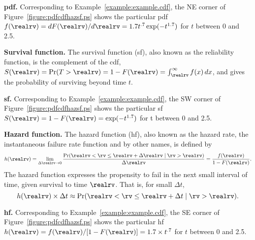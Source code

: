 \begin{example}
\label{example:example.pdf}{\bf pdf.}
Corresponding to Example~\ref{example:example.cdf}, the NE corner of
Figure~\ref{figure:pdfcdfhazsf.ps} shows the particular pdf
$f(\realrv)=dF(\realrv)/d\realrv=1.7t^{.7}\exp(-t^{1.7})$ for $t$
between 0 and 2.5.
\end{example}



\noindent
{\bf Survival function.}
The survival function (sf), also known as the reliability function, is
the complement of the cdf, $S(\realrv)=\Pr(T >
\realrv)=1-F(\realrv)=\int^{\infty}_{\realrv} f(x)\, dx$, and gives the
probability of surviving beyond time $t$.

\begin{example}
\label{example:example.sf}{\bf sf.}
Corresponding to Example~\ref{example:example.cdf}, the SW corner of
Figure~\ref{figure:pdfcdfhazsf.ps} shows the particular sf
$S(\realrv)=1-F(\realrv)=\exp(-t^{1.7})$ for t between 0 and 2.5.
\end{example}

\noindent
{\bf Hazard function.}
The hazard function (hf), also known as the hazard rate,
the instantaneous failure rate
function and by other names, is defined by
\begin{displaymath}
h(\realrv)=\lim_{\Delta \realrv \rightarrow 0} \frac{\Pr(
\realrv < \rv\le 
\realrv+\Delta \realrv  \mid\rv > \realrv)}{\Delta \realrv} 
= \frac{f(\realrv)}{1-F(\realrv)}.
\end{displaymath}
The hazard function expresses the propensity to fail in the next small
interval of 	 time, given survival to time $\realrv$. That is, for
small $\Delta t$,
\begin{equation}
\label{equation:hazard.prob.approx}
h(\realrv) \times \Delta t \approx \Pr(\realrv < \rv \le \realrv+\Delta t \mid
\rv > \realrv). 
\end{equation}
 
\begin{example}
\label{example:example.hf}{\bf hf.}
Corresponding to Example~\ref{example:example.cdf}, the SE corner of
Figure~\ref{figure:pdfcdfhazsf.ps} shows the particular hf
$h(\realrv)=f(\realrv)/[1-F(\realrv)]=1.7 \times t^{.7}$ for $t$
between 0 and 2.5.
\end{example}

